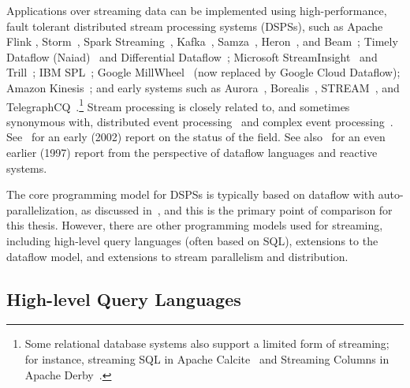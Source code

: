 Applications over streaming data can be implemented using
high-performance, fault tolerant distributed stream processing systems (DSPSs), such as
Apache
Flink \cite{Flink2015,Flink2017,Flink},
Storm~\cite{Storm,StormConcepts},
Spark Streaming~\cite{Spark2013,SparkStreaming},
Kafka~\cite{garg2013apache},
Samza~\cite{Samza2017},
Heron~\cite{kulkarni2015twitter-heron,Heron},
and Beam~\cite{Beam};
Timely Dataflow (Naiad)~\cite{Naiad2013,Timely}
and
Differential Dataflow~\cite{mcsherry2013differential};
Microsoft
StreamInsight~\cite{ACGS2011SI}
and Trill~\cite{chandramouli2014trill};
IBM SPL~\cite{HAG2013SPL};
Google MillWheel~\cite{MillWheel} (now replaced by Google Cloud Dataflow);
Amazon Kinesis~\cite{AmazonKinesis};
and early systems such as
Aurora~\cite{Aurora,AuroraWeb},
Borealis~\cite{Borealis,BorealisWeb},
STREAM~\cite{STREAM2004},
and TelegraphCQ~\cite{Telegraph}.\footnote{
  Some relational database systems also support a limited form of streaming;
  for instance, streaming SQL in Apache Calcite~\cite{begoli2018apache,CalciteStreaming} and Streaming Columns in Apache Derby~\cite{DerbyStreaming}.
}
Stream processing is closely related to,
and sometimes synonymous with,
distributed event processing~\cite{DEBS2006}
and complex event processing~\cite{CEP2006}.
See~\cite{babcock2002models} for an early (2002) report on the status of the field.
See also~\cite{stephens1997survey} for an even earlier (1997) report from the perspective of dataflow languages and reactive systems.

The core programming model for DSPSs is typically based on dataflow with auto-parallelization, as discussed in~,
and this is the primary point of comparison for this thesis.
However, there are other programming models used for streaming, including
high-level query languages (often based on SQL),
extensions to the dataflow model,
and extensions to stream parallelism and distribution.

\subsection{High-level Query Languages}

